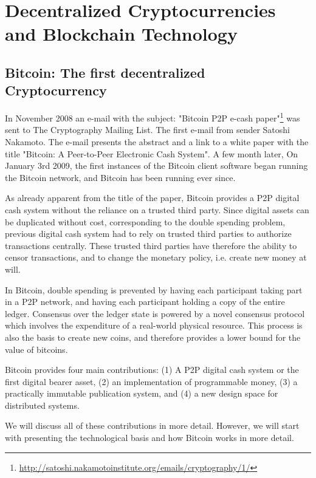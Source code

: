 \chapter{Decentralized Cryptocurrencies and Blockchain Technology}
\label{sec:crypto}


\section{Bitcoin: The first decentralized Cryptocurrency}

 In November 2008 an e-mail with the subject: "Bitcoin P2P e-cash paper"\footnote{\url{http://satoshi.nakamotoinstitute.org/emails/cryptography/1/}} was sent to The Cryptography Mailing List. The first e-mail from sender Satoshi Nakamoto. The e-mail presents the abstract and a link to a white paper with the title "Bitcoin: A Peer-to-Peer Electronic Cash System". A few month later, On January 3rd 2009, the first instances of the Bitcoin client software began running the Bitcoin network, and Bitcoin has been running ever since. 

 As already apparent from the title of the paper, Bitcoin provides a P2P digital cash system without the reliance on a trusted third party. Since digital assets can be duplicated without cost, corresponding to the double spending problem, previous digital cash system had to rely on trusted third parties to authorize transactions centrally. These trusted third parties have therefore the ability to censor transactions, and to change the monetary policy, i.e. create new money at will. 

 In Bitcoin, double spending is prevented by having each participant taking part in a P2P network, and having each participant holding a copy of the entire ledger. Consensus over the ledger state is powered by a novel consensus protocol which involves the expenditure of a real-world physical resource. This process is also the basis to create new coins, and therefore provides a lower bound for the value of bitcoins. 

Bitcoin provides four main contributions: (1) A P2P digital cash system or the first digital bearer asset, (2) an implementation of programmable money, (3) a practically immutable publication system, and (4) a new design space for distributed systems. 

We will discuss all of these contributions in more detail. However, we will start with presenting the technological basis and how Bitcoin works in more detail.

